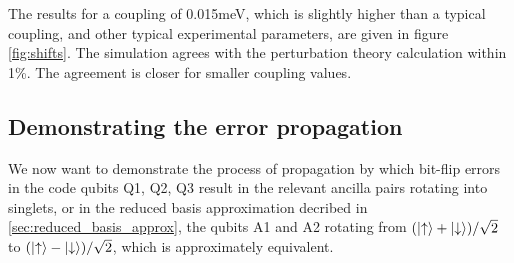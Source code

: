 \documentclass{report}
\begin{document}
The results for a coupling of 0.015\unit{\milli\electronvolt}, which is slightly higher than a typical coupling, and other typical experimental parameters, are given in figure \ref{fig:shifts}. The simulation agrees with the perturbation theory calculation within 1\%. The agreement is closer for smaller coupling values.

\subsection{Demonstrating the error propagation}
We now want to demonstrate the process of propagation by which bit-flip errors in the code qubits Q1, Q2, Q3 result in the relevant ancilla pairs rotating into singlets, or in the reduced basis approximation decribed in \ref{sec:reduced_basis_approx}, the qubits A1 and A2 rotating from $(\ket{\uparrow} + \ket{\downarrow})/\sqrt{2}$ to $(\ket{\uparrow} - \ket{\downarrow})/\sqrt{2}$, which is approximately equivalent.
\end{document}

